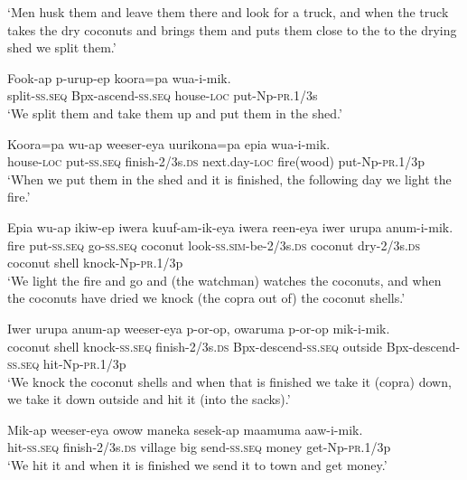 \glt ‘Men husk them and leave them there and look for a truck, and when the truck takes the dry coconuts and brings them and puts them close to the to the drying shed we split them.’ \\
\z


\ea\label{ex:a:x7}
\gll  Fook-ap  p-urup-ep  koora=pa  wua-i-mik. \\
split-\textsc{ss.seq}  Bpx-ascend-\textsc{ss.seq}  house-\textsc{loc}  put-Np-\textsc{pr}.1/3s \\
\glt ‘We split them and take them up and put them in the shed.’ \\
\z


\ea\label{ex:a:x8}
\gll  Koora=pa  wu-ap  weeser-eya  uurikona=pa  epia  wua-i-mik. \\
house-\textsc{loc}  put-\textsc{ss.seq}  finish-2/3s.\textsc{ds}  next.day-\textsc{loc}  fire(wood)  put-Np-\textsc{pr}.1/3p \\
\glt ‘When we put them in the shed and it is finished, the following day we light the fire.’ \\
\z


\ea\label{ex:a:x9}
\gll  Epia  wu-ap  ikiw-ep  iwera  kuuf-am-ik-eya  iwera  reen-eya                  iwer  urupa  anum-i-mik. \\
fire  put-\textsc{ss.seq}  go-\textsc{ss.seq}  coconut  look-\textsc{ss}.\textsc{sim}-be-2/3s.\textsc{ds}  coconut  dry-2/3s.\textsc{ds}  coconut  shell  knock-Np-\textsc{pr}.1/3p \\


\glt ‘We light the fire and go and (the watchman) watches the coconuts, and when the coconuts have dried we knock (the copra out of) the coconut shells.’ \\
\z


\ea\label{ex:a:x10}
\gll  Iwer  urupa  anum-ap  weeser-eya  p-or-op,                  owaruma  p-or-op  mik-i-mik. \\
coconut  shell  knock-\textsc{ss.seq}  finish-2/3s.\textsc{ds}  Bpx-descend-\textsc{ss.seq}  outside  Bpx-descend-\textsc{ss.seq}  hit-Np-\textsc{pr}.1/3p \\


\glt ‘We knock the coconut shells and when that is finished we take it (copra) down, we take it down outside and hit it (into the sacks).’ \\
\z


\ea\label{ex:a:x11}
\gll  Mik-ap  weeser-eya  owow  maneka  sesek-ap  maamuma  aaw-i-mik. \\
hit-\textsc{ss.seq}  finish-2/3s.\textsc{ds}  village  big  send-\textsc{ss.seq}  money  get-Np-\textsc{pr}.1/3p \\
\glt ‘We hit it and when it is finished we send it to town and get money.’ \\
\z


